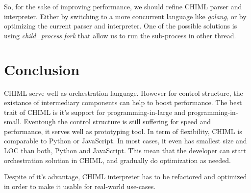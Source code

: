 \documentclass[conference]{IEEEtran}
\begin{document}
So, for the sake of improving performance, we should refine CHIML parser and interpreter. Either by switching to a more concurrent language like {\it golang}, or by optimizing the current parser and interpreter. One of the possible solutions is using {\it child\_process.fork} that allow us to run the sub-process in other thread.


\section{Conclusion}

CHIML serve well as orchestration language. However for control structure, the existance of intermediary components can help to boost performance. The best trait of CHIML is it's support for programming-in-large and programming-in-small. Eventough the control structure is still suffering for speed and performance, it serves well as prototyping tool. In term of flexibility, CHIML is comparable to Python or JavaScript. In most cases, it even has smallest size and LOC than both, Python and JavaScript. This mean that the developer can start orchestration solution in CHIML, and gradually do optimization as needed.

Despite of it's advantage, CHIML interpreter has to be refactored and optimized in order to make it usable for real-world use-cases.




\ifCLASSOPTIONcaptionsoff
  \newpage
\fi




\end{document}
